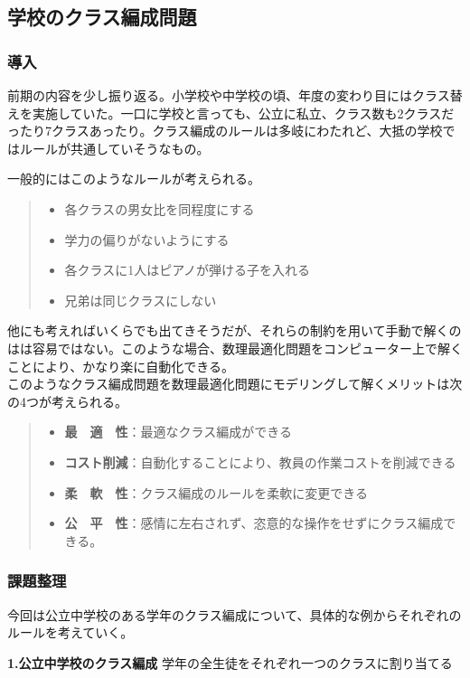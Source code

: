 \documentclass{jsarticle}
\begin{document}
\newpage

\subsection{学校のクラス編成問題}
\subsubsection{導入}
前期の内容を少し振り返る。小学校や中学校の頃、年度の変わり目にはクラス替えを実施していた。一口に学校と言っても、公立に私立、クラス数も2クラスだったり7クラスあったり。クラス編成のルールは多岐にわたれど、大抵の学校ではルールが共通していそうなもの。
\par 一般的にはこのようなルールが考えられる。
\begin{quote}
 	\begin{itemize}
 		 \item 各クラスの男女比を同程度にする
 		 \item 学力の偏りがないようにする
		 \item 各クラスに1人はピアノが弾ける子を入れる
		 \item 兄弟は同じクラスにしない
 	\end{itemize}
\end{quote}
\par 他にも考えればいくらでも出てきそうだが、それらの制約を用いて手動で解くのはは容易ではない。このような場合、数理最適化問題をコンピューター上で解くことにより、かなり楽に自動化できる。\\
このようなクラス編成問題を数理最適化問題にモデリングして解くメリットは次の4つが考えられる。

\begin{quote}
 	\begin{itemize}
 		 \item {\bf 最　適　性}：最適なクラス編成ができる
 		 \item {\bf コスト削減}：自動化することにより、教員の作業コストを削減できる
		 \item {\bf 柔　軟　性}：クラス編成のルールを柔軟に変更できる
		 \item {\bf 公　平　性}：感情に左右されず、恣意的な操作をせずにクラス編成できる。
 	\end{itemize}
\end{quote}

\subsubsection{課題整理}
今回は公立中学校のある学年のクラス編成について、具体的な例からそれぞれのルールを考えていく。
\begin{itembox}[l]{{\bf 1.公立中学校のクラス編成}}
	学年の全生徒をそれぞれ一つのクラスに割り当てる
\end{itembox}\\	
\end{document}

